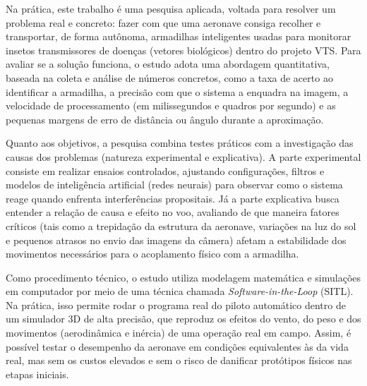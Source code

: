 
Na prática, este trabalho é uma pesquisa aplicada, voltada para resolver um problema real e concreto: fazer com que uma aeronave consiga recolher e transportar, de forma autônoma, armadilhas inteligentes usadas para monitorar insetos transmissores de doenças (vetores biológicos) dentro do projeto VTS. Para avaliar se a solução funciona, o estudo adota uma abordagem quantitativa, baseada na coleta e análise de números concretos, como a taxa de acerto ao identificar a armadilha, a precisão com que o sistema a enquadra na imagem, a velocidade de processamento (em milissegundos e quadros por segundo) e as pequenas margens de erro de distância ou ângulo durante a aproximação.

Quanto aos objetivos, a pesquisa combina testes práticos com a investigação das causas dos problemas (natureza experimental e explicativa). A parte experimental consiste em realizar ensaios controlados, ajustando configurações, filtros e modelos de inteligência artificial (redes neurais) para observar como o sistema reage quando enfrenta interferências propositais. Já a parte explicativa busca entender a relação de causa e efeito no voo, avaliando de que maneira fatores críticos (tais como a trepidação da estrutura da aeronave, variações na luz do sol e pequenos atrasos no envio das imagens da câmera) afetam a estabilidade dos movimentos necessários para o acoplamento físico com a armadilha.

Como procedimento técnico, o estudo utiliza modelagem matemática e simulações em computador por meio de uma técnica chamada \textit{Software-in-the-Loop} (SITL). Na prática, isso permite rodar o programa real do piloto automático dentro de um simulador 3D de alta precisão, que reproduz os efeitos do vento, do peso e dos movimentos (aerodinâmica e inércia) de uma operação real em campo. Assim, é possível testar o desempenho da aeronave em condições equivalentes às da vida real, mas sem os custos elevados e sem o risco de danificar protótipos físicos nas etapas iniciais.


